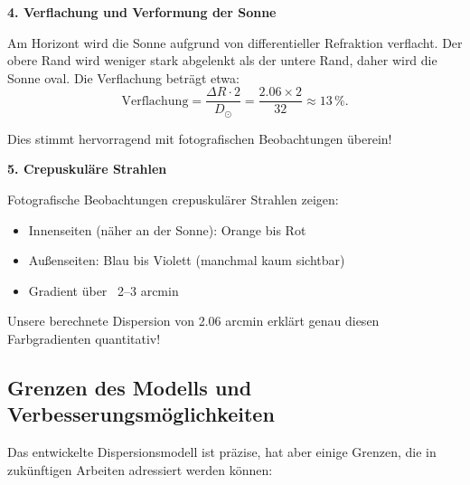 \documentclass[12pt,a4paper]{article}
\begin{document}
\textbf{4. Verflachung und Verformung der Sonne}

Am Horizont wird die Sonne aufgrund von differentieller Refraktion verflacht.
Der obere Rand wird weniger stark abgelenkt als der untere Rand, daher
wird die Sonne oval. Die Verflachung beträgt etwa:
\begin{equation}
	\text{Verflachung} = \frac{\Delta R \cdot 2}{D_{\odot}} = \frac{2.06 \times 2}{32} \approx 13\,\%.
	\label{eq:flattening}
\end{equation}

Dies stimmt hervorragend mit fotografischen Beobachtungen überein!

\textbf{5. Crepuskuläre Strahlen}

Fotografische Beobachtungen crepuskulärer Strahlen zeigen:
\begin{itemize}
	\item Innenseiten (näher an der Sonne): Orange bis Rot
	\item Außenseiten: Blau bis Violett (manchmal kaum sichtbar)
	\item Gradient über ~2–3 arcmin
\end{itemize}

Unsere berechnete Dispersion von 2.06 arcmin erklärt genau diesen
Farbgradienten quantitativ!

\subsection{Grenzen des Modells und Verbesserungsmöglichkeiten}
\label{subsec:limitations}

Das entwickelte Dispersionsmodell ist präzise, hat aber einige Grenzen,
die in zukünftigen Arbeiten adressiert werden können:
\end{document}
